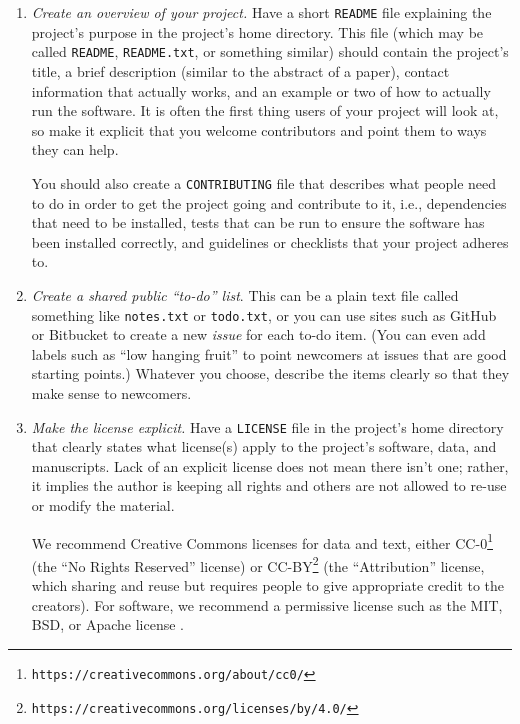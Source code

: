 \documentclass[10pt]{article}
\newcommand{\recommend}[1]{\textit{#1}}
\newcommand{\withurl}[2]{{#1}\footnote{\texttt{#2}}}
\begin{document}
\begin{enumerate}

\item
  \recommend{Create an overview of your project.}  Have a short
  \texttt{README} file explaining the project's purpose in the
  project's home directory.  This file (which may be called
  \texttt{README}, \texttt{README.txt}, or something similar) should
  contain the project's title, a brief description (similar to the
  abstract of a paper), contact information that actually works, and
  an example or two of how to actually run the software.  It is often
  the first thing users of your project will look at, so make it
  explicit that you welcome contributors and point them to ways they
  can help.

  You should also create a \texttt{CONTRIBUTING} file that describes
  what people need to do in order to get the project going and
  contribute to it, i.e., dependencies that need to be installed,
  tests that can be run to ensure the software has been installed
  correctly, and guidelines or checklists that your project adheres
  to.

\item
  \recommend{Create a shared public ``to-do'' list}.  This can be a
  plain text file called something like \texttt{notes.txt} or
  \texttt{todo.txt}, or you can use sites such as GitHub or Bitbucket
  to create a new \emph{issue} for each to-do item. (You can even add
  labels such as ``low hanging fruit'' to point newcomers at issues
  that are good starting points.)  Whatever you choose, describe the
  items clearly so that they make sense to newcomers.

\item
  \recommend{Make the license explicit.}  Have a \texttt{LICENSE} file
  in the project's home directory that clearly states what license(s)
  apply to the project's software, data, and manuscripts. Lack of an
  explicit license does not mean there isn't one; rather, it implies
  the author is keeping all rights and others are not allowed to
  re-use or modify the material.

  We recommend Creative Commons licenses for data and text, either
  \withurl{CC-0}{https://creativecommons.org/about/cc0/} (the ``No
  Rights Reserved'' license) or
  \withurl{CC-BY}{https://creativecommons.org/licenses/by/4.0/} (the
  ``Attribution'' license, which sharing and reuse but requires people
  to give appropriate credit to the creators).  For software, we
  recommend a permissive license such as the MIT, BSD, or Apache
  license \cite{laurent2004}.


\end{enumerate}
\end{document}
